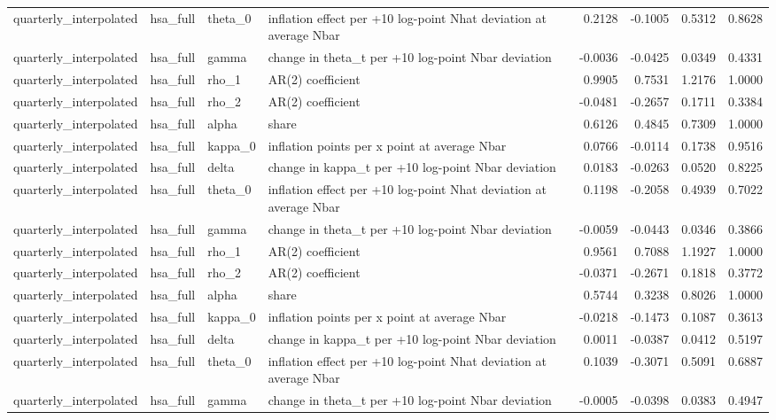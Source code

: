 \begin{tabular}{llllrrrr}
quarterly\_interpolated & hsa\_full & theta\_0 & inflation effect per +10 log-point Nhat deviation at average Nbar & 0.2128 & -0.1005 & 0.5312 & 0.8628 \\
quarterly\_interpolated & hsa\_full & gamma & change in theta\_t per +10 log-point Nbar deviation & -0.0036 & -0.0425 & 0.0349 & 0.4331 \\
quarterly\_interpolated & hsa\_full & rho\_1 & AR(2) coefficient & 0.9905 & 0.7531 & 1.2176 & 1.0000 \\
quarterly\_interpolated & hsa\_full & rho\_2 & AR(2) coefficient & -0.0481 & -0.2657 & 0.1711 & 0.3384 \\
quarterly\_interpolated & hsa\_full & alpha & share & 0.6126 & 0.4845 & 0.7309 & 1.0000 \\
quarterly\_interpolated & hsa\_full & kappa\_0 & inflation points per x point at average Nbar & 0.0766 & -0.0114 & 0.1738 & 0.9516 \\
quarterly\_interpolated & hsa\_full & delta & change in kappa\_t per +10 log-point Nbar deviation & 0.0183 & -0.0263 & 0.0520 & 0.8225 \\
quarterly\_interpolated & hsa\_full & theta\_0 & inflation effect per +10 log-point Nhat deviation at average Nbar & 0.1198 & -0.2058 & 0.4939 & 0.7022 \\
quarterly\_interpolated & hsa\_full & gamma & change in theta\_t per +10 log-point Nbar deviation & -0.0059 & -0.0443 & 0.0346 & 0.3866 \\
quarterly\_interpolated & hsa\_full & rho\_1 & AR(2) coefficient & 0.9561 & 0.7088 & 1.1927 & 1.0000 \\
quarterly\_interpolated & hsa\_full & rho\_2 & AR(2) coefficient & -0.0371 & -0.2671 & 0.1818 & 0.3772 \\
quarterly\_interpolated & hsa\_full & alpha & share & 0.5744 & 0.3238 & 0.8026 & 1.0000 \\
quarterly\_interpolated & hsa\_full & kappa\_0 & inflation points per x point at average Nbar & -0.0218 & -0.1473 & 0.1087 & 0.3613 \\
quarterly\_interpolated & hsa\_full & delta & change in kappa\_t per +10 log-point Nbar deviation & 0.0011 & -0.0387 & 0.0412 & 0.5197 \\
quarterly\_interpolated & hsa\_full & theta\_0 & inflation effect per +10 log-point Nhat deviation at average Nbar & 0.1039 & -0.3071 & 0.5091 & 0.6887 \\
quarterly\_interpolated & hsa\_full & gamma & change in theta\_t per +10 log-point Nbar deviation & -0.0005 & -0.0398 & 0.0383 & 0.4947 \\

\end{tabular}
